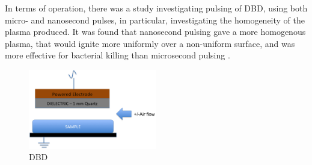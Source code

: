 \documentclass[11pt, oneside]{article}   	%
\newcommand{\todo}[1]{ \textcolor{red}{\bf{To Do:} #1}}
\begin{document}
In terms of operation, there was a study investigating pulsing of DBD, using both micro- and nanosecond pulses, in particular, investigating the homogeneity of the plasma produced. 
It was found that nanosecond pulsing gave a more homogenous plasma, that would ignite more uniformly over a non-uniform surface, and was more effective for bacterial killing than microsecond pulsing \cite{Ayan2009application, Ayan2008nanosecond}.







\begin{figure}
\centering
\includegraphics[width=0.5\textwidth]{Figures/DBD}
\caption{DBD}
\label{fig:DBD}
\end{figure}






\end{document}
